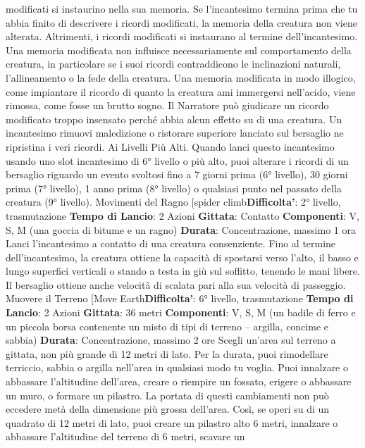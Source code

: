 \begin{multicols}{2}
modificati si instaurino nella sua memoria. Se
l’incantesimo termina prima che tu abbia finito di
descrivere i ricordi modificati, la memoria della creatura
non viene alterata. Altrimenti, i ricordi modificati si
instaurano al termine dell’incantesimo.
Una memoria modificata non influisce necessariamente
sul comportamento della creatura, in particolare se i
suoi ricordi contraddicono le inclinazioni naturali,
l’allineamento o la fede della creatura. Una memoria
modificata in modo illogico, come impiantare il ricordo di
quanto la creatura ami immergersi nell’acido, viene
rimossa, come fosse un brutto sogno. Il Narratore può
giudicare un ricordo modificato troppo insensato perché
abbia alcun effetto su di una creatura.
Un incantesimo rimuovi maledizione o ristorare
superiore lanciato sul bersaglio ne ripristina i veri
ricordi.
Ai Livelli Più Alti. Quando lanci questo incantesimo
usando uno slot incantesimo di 6° livello o più alto, puoi
alterare i ricordi di un bersaglio riguardo un evento
svoltosi fino a 7 giorni prima (6° livello), 30 giorni prima
(7° livello), 1 anno prima (8° livello) o qualsiasi punto
nel passato della creatura (9° livello).
Movimenti del Ragno
[spider climb\textbf{Difficolta'}:
2° livello, trasmutazione
\textbf{Tempo di Lancio}: 2 Azioni
\textbf{Gittata}: Contatto
\textbf{Componenti}: V, S, M (una goccia di bitume e un
ragno)
\textbf{Durata}: Concentrazione, massimo 1 ora
Lanci l’incantesimo a contatto di una creatura
consenziente. Fino al termine dell’incantesimo, la
creatura ottiene la capacità di spostarsi verso l’alto, il
basso e lungo superfici verticali o stando a testa in giù
sul soffitto, tenendo le mani libere. Il bersaglio ottiene
anche velocità di scalata pari alla sua velocità di
passeggio.
Muovere il Terreno
[Move Earth\textbf{Difficolta'}:
6° livello, trasmutazione
\textbf{Tempo di Lancio}: 2 Azioni
\textbf{Gittata}: 36 metri
\textbf{Componenti}: V, S, M (un badile di ferro e un piccola
borsa contenente un misto di tipi di terreno – argilla,
concime e sabbia)
\textbf{Durata}: Concentrazione, massimo 2 ore
Scegli un’area sul terreno a gittata, non più grande di
12 metri di lato. Per la durata, puoi rimodellare terriccio,
sabbia o argilla nell’area in qualsiasi modo tu voglia.
Puoi innalzare o abbassare l’altitudine dell’area, creare
o riempire un fossato, erigere o abbassare un muro, o
formare un pilastro. La portata di questi cambiamenti
non può eccedere metà della dimensione più grossa
dell’area. Così, se operi su di un quadrato di 12 metri di
lato, puoi creare un pilastro alto 6 metri, innalzare o
abbassare l’altitudine del terreno di 6 metri, scavare un

\end{multicols}
